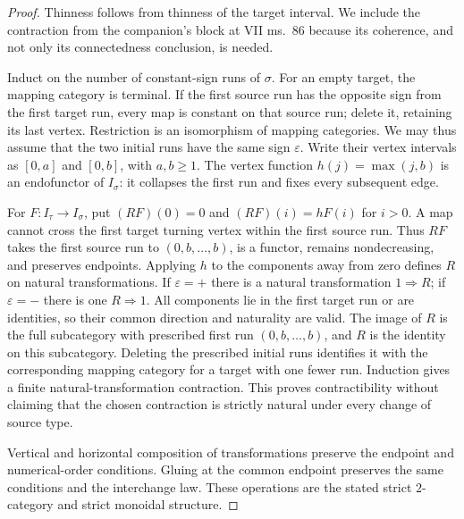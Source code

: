 \begin{proof}
Thinness follows from thinness of the target interval. We include the contraction from the companion's block at VII ms.~86 because its coherence, and not only its connectedness conclusion, is needed.

Induct on the number of constant-sign runs of $\sigma$. For an empty target, the mapping category is terminal. If the first source run has the opposite sign from the first target run, every map is constant on that source run; delete it, retaining its last vertex. Restriction is an isomorphism of mapping categories. We may thus assume that the two initial runs have the same sign $\varepsilon$. Write their vertex intervals as $[0,a]$ and $[0,b]$, with $a,b\geq1$. The vertex function $h(j)=\max(j,b)$ is an endofunctor of $I_\sigma$: it collapses the first run and fixes every subsequent edge.

For $F:I_\tau\to I_\sigma$, put $(RF)(0)=0$ and $(RF)(i)=hF(i)$ for $i>0$. A map cannot cross the first target turning vertex within the first source run. Thus $RF$ takes the first source run to $(0,b,\ldots,b)$, is a functor, remains nondecreasing, and preserves endpoints. Applying $h$ to the components away from zero defines $R$ on natural transformations. If $\varepsilon=+$ there is a natural transformation $1\Rightarrow R$; if $\varepsilon=-$ there is one $R\Rightarrow1$. All components lie in the first target run or are identities, so their common direction and naturality are valid. The image of $R$ is the full subcategory with prescribed first run $(0,b,\ldots,b)$, and $R$ is the identity on this subcategory. Deleting the prescribed initial runs identifies it with the corresponding mapping category for a target with one fewer run. Induction gives a finite natural-transformation contraction. This proves contractibility without claiming that the chosen contraction is strictly natural under every change of source type.

Vertical and horizontal composition of transformations preserve the endpoint and numerical-order conditions. Gluing at the common endpoint preserves the same conditions and the interchange law. These operations are the stated strict $2$-category and strict monoidal structure.
\end{proof}

